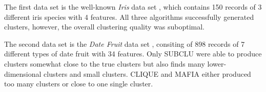 The first data set is the well-known \textit{Iris} data set \cite{iris}, which contains 150 records of 3 different iris species with 4 features. All three algorithms successfully generated clusters, however, the overall clustering quality was suboptimal.

The second data set is the \textit{Date Fruit} data set \cite{date-fruit}, consiting of 898 records of 7 different types of date fruit with 34 features. Only SUBCLU were able to produce clusters somewhat close to the true clusters but also finds many lower-dimensional clusters and small clusters. CLIQUE and MAFIA either produced too many clusters or close to one single cluster.
